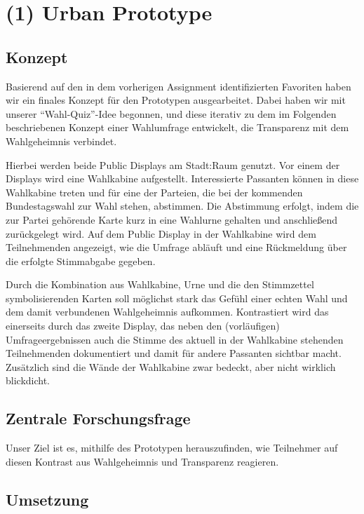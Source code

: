 \section{(1) Urban Prototype}\label{urban-prototype}

\subsection{Konzept}\label{konzept}

Basierend auf den in dem vorherigen Assignment identifizierten Favoriten haben wir ein finales Konzept für den Prototypen ausgearbeitet.
Dabei haben wir mit unserer ``Wahl-Quiz''-Idee begonnen, und diese iterativ zu dem im Folgenden beschriebenen Konzept einer Wahlumfrage entwickelt, die Transparenz mit dem Wahlgeheimnis verbindet.

Hierbei werden beide Public Displays am Stadt:Raum genutzt.
Vor einem der Displays wird eine Wahlkabine aufgestellt.
Interessierte Passanten können in diese Wahlkabine treten und für eine der Parteien, die bei der kommenden Bundestagswahl zur Wahl stehen, abstimmen.
Die Abstimmung erfolgt, indem die zur Partei gehörende Karte kurz in eine Wahlurne gehalten und anschließend zurückgelegt wird.
Auf dem Public Display in der Wahlkabine wird dem Teilnehmenden angezeigt, wie die Umfrage abläuft und eine Rückmeldung über die erfolgte Stimmabgabe gegeben.

Durch die Kombination aus Wahlkabine, Urne und die den Stimmzettel symbolisierenden Karten soll möglichst stark das Gefühl einer echten Wahl und dem damit verbundenen Wahlgeheimnis aufkommen.
Kontrastiert wird das einerseits durch das zweite Display, das neben den (vorläufigen) Umfrageergebnissen auch die Stimme des aktuell in der Wahlkabine stehenden Teilnehmenden dokumentiert und damit für andere Passanten sichtbar macht.
Zusätzlich sind die Wände der Wahlkabine zwar bedeckt, aber nicht wirklich blickdicht.

\subsection{Zentrale Forschungsfrage}\label{zentrale-forschungsfrage}

Unser Ziel ist es, mithilfe des Prototypen herauszufinden, wie Teilnehmer auf diesen Kontrast aus Wahlgeheimnis und Transparenz reagieren.

\subsection{Umsetzung}\label{umsetzung}

